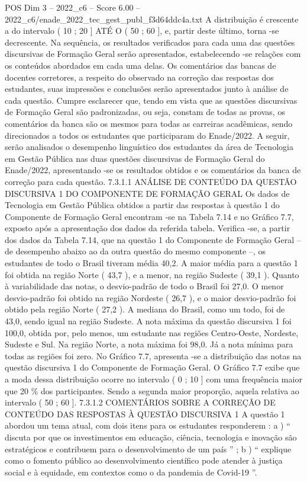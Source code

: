 \begin{textsample}{POS Dim 3 – 2022\_c6 – Score 6.00 – 2022\_c6/enade\_2022\_tec\_gest\_publ\_f3d64ddc4a.txt}
A distribuição é crescente a do intervalo ( 10 ; 20 ] ATÉ O ( 50 ; 60 ], e, partir deste último, torna -se decrescente.
Na sequência, os resultados verificados para cada uma das questões discursivas de Formação Geral serão apresentados, estabelecendo -se relações com os conteúdos abordados em cada uma delas.
Os comentários das bancas de docentes corretores, a respeito do observado na correção das respostas dos estudantes, suas impressões e conclusões serão apresentados junto à análise de cada questão.
Cumpre esclarecer que, tendo em vista que as questões discursivas de Formação Geral são padronizadas, ou seja, constam de todas as provas, os comentários da banca são os mesmos para todas as carreiras acadêmicas, sendo direcionados a todos os estudantes que participaram do Enade/2022.
A seguir, serão analisados o desempenho linguístico dos estudantes da área de Tecnologia em Gestão Pública nas duas questões discursivas de Formação Geral do Enade/2022, apresentando -se os resultados obtidos e os comentários da banca de correção para cada questão. 7.3.1.1 ANÁLISE DE CONTEÚDO DA QUESTÃO DISCURSIVA 1 DO COMPONENTE DE FORMAÇÃO GERAL Os dados de Tecnologia em Gestão Pública obtidos a partir das respostas à questão 1 do Componente de Formação Geral encontram -se na Tabela 7.14 e no Gráfico 7.7, exposto após a apresentação dos dados da referida tabela.
Verifica -se, a partir dos dados da Tabela 7.14, que na questão 1 do Componente de Formação Geral – de desempenho abaixo ao da outra questão do mesmo componente –, os estudantes de todo o Brasil tiveram média 40,2.
A maior média para a questão 1 foi obtida na região Norte ( 43,7 ), e a menor, na região Sudeste ( 39,1 ).
Quanto à variabilidade das notas, o desvio-padrão de todo o Brasil foi 27,0.
O menor desvio-padrão foi obtido na região Nordeste ( 26,7 ), e o maior desvio-padrão foi obtido pela região Norte ( 27,2 ).
A mediana do Brasil, como um todo, foi de 43,0, sendo igual na região Sudeste.
A nota máxima da questão discursiva 1 foi 100,0, obtida por, pelo menos, um estudante nas regiões Centro-Oeste, Nordeste, Sudeste e Sul.
Na região Norte, a nota máxima foi 98,0.
Já a nota mínima para todas as regiões foi zero.
No Gráfico 7.7, apresenta -se a distribuição das notas na questão discursiva 1 do Componente de Formação Geral.
O Gráfico 7.7 exibe que a moda dessa distribuição ocorre no intervalo ( 0 ; 10 ] com uma frequência maior que 20 \% dos participantes.
Sendo a segunda maior proporção, aquela relativa ao intervalo ( 50 ; 60 ]. 7.3.1.2 COMENTÁRIOS SOBRE A CORREÇÃO DE CONTEÚDO DAS RESPOSTAS À QUESTÃO DISCURSIVA 1 A questão 1 abordou um tema atual, com dois itens para os estudantes responderem : a ) “ discuta por que os investimentos em educação, ciência, tecnologia e inovação são estratégicos e contribuem para o desenvolvimento de um país ” ; b ) “ explique como o fomento público ao desenvolvimento científico pode atender à justiça social e à equidade, em contextos como o da pandemia de Covid-19 ”.

\end{textsample}

